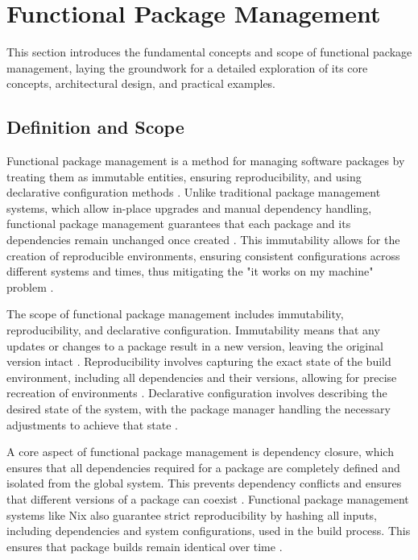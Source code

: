 \section{Functional Package Management}

This section introduces the fundamental concepts and scope of functional package
management, laying the groundwork for a detailed exploration of its core concepts,
architectural design, and practical examples.

\subsection{Definition and Scope}

Functional package management is a method for managing software packages by treating
them as immutable entities, ensuring reproducibility, and using declarative configuration
methods \cite[Section 2.1]{courtesFunctionalPackageManagement2013}. Unlike traditional
package management systems, which allow in-place upgrades and manual dependency handling,
functional package management guarantees that each package and its dependencies remain
unchanged once created \cite[Section 2.2]{courtesFunctionalPackageManagement2013}.
This immutability allows for the creation of reproducible environments, ensuring
consistent configurations across different systems and times, thus mitigating the
"it works on my machine" problem \cite[Section 2, Page 5]{rahmanWorksMeCannot2022}.

The scope of functional package management includes immutability, reproducibility,
and declarative configuration. Immutability means that any updates or changes to a
package result in a new version, leaving the original version intact
\cite[Page 84]{dolstraNixSafePolicyFree2004}. Reproducibility involves capturing
the exact state of the build environment, including all dependencies and their
versions, allowing for precise recreation of environments
\cite[Section 2.1]{courtesFunctionalPackageManagement2013}. Declarative configuration
involves describing the desired state of the system, with the package manager handling
the necessary adjustments to achieve that state \cite[Section 2.1]{courtesFunctionalPackageManagement2013}.

A core aspect of functional package management is dependency closure, which
ensures that all dependencies required for a package are completely defined and isolated
from the global system. This prevents dependency conflicts and ensures that different
versions of a package can coexist \cite[Chapter 3.3]{dolstraPurelyFunctionalSoftware2006}.
Functional package management systems like Nix also guarantee strict reproducibility by
hashing all inputs, including dependencies and system configurations, used in the build
process. This ensures that package builds remain identical over time
\cite[Section 2.2]{courtesFunctionalPackageManagement2013}.

